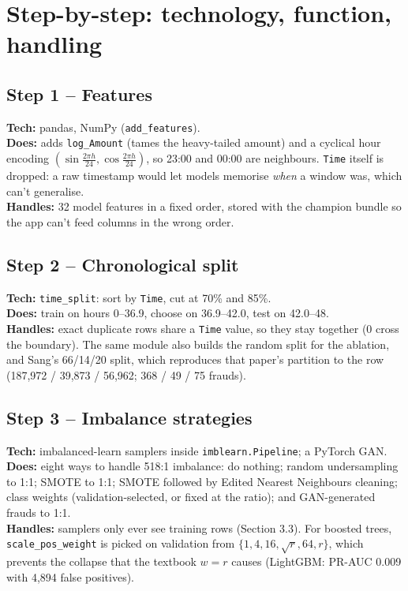 \documentclass[11pt,a4paper]{article}
\begin{document}
\section{Step-by-step: technology, function, handling}
\subsection{Step 1 -- Features}
\textbf{Tech:} pandas, NumPy (\texttt{add\_features}).\\
\textbf{Does:} adds \texttt{log\_Amount} (tames the heavy-tailed amount) and a cyclical hour encoding
$(\sin\frac{2\pi h}{24}, \cos\frac{2\pi h}{24})$, so 23:00 and 00:00 are neighbours. \texttt{Time} itself
is dropped: a raw timestamp would let models memorise \emph{when} a window was, which can't generalise.\\
\textbf{Handles:} 32 model features in a fixed order, stored with the champion bundle so the app can't
feed columns in the wrong order.

\subsection{Step 2 -- Chronological split}
\textbf{Tech:} \texttt{time\_split}: sort by \texttt{Time}, cut at 70\% and 85\%.\\
\textbf{Does:} train on hours 0--36.9, choose on 36.9--42.0, test on 42.0--48.\\
\textbf{Handles:} exact duplicate rows share a \texttt{Time} value, so they stay together (0 cross the
boundary). The same module also builds the random split for the ablation, and Sang's 66/14/20 split,
which reproduces that paper's partition to the row (187,972 / 39,873 / 56,962; 368 / 49 / 75 frauds).

\subsection{Step 3 -- Imbalance strategies}
\textbf{Tech:} imbalanced-learn samplers inside \texttt{imblearn.Pipeline}; a PyTorch GAN.\\
\textbf{Does:} eight ways to handle 518:1 imbalance: do nothing; random undersampling to 1:1; SMOTE to
1:1; SMOTE followed by Edited Nearest Neighbours cleaning; class weights (validation-selected, or
fixed at the ratio); and GAN-generated frauds to 1:1.\\
\textbf{Handles:} samplers only ever see training rows (Section 3.3). For boosted trees,
\texttt{scale\_pos\_weight} is picked on validation from $\{1, 4, 16, \sqrt{r}, 64, r\}$, which prevents
the collapse that the textbook $w=r$ causes (LightGBM: PR-AUC 0.009 with 4,894 false positives).
\end{document}
